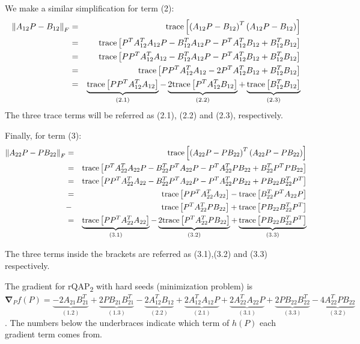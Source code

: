 \documentclass[12pt,oneside,final]{thesis}
\begin{document}
We make a similar simplification for term (2):
\begin{align*}
\left\Vert A_{12}P-B_{12}\right\Vert _{F} & = & \textup{trace}\left[\left(A_{12}P-B_{12}\right)^{T}\left(A_{12}P-B_{12}\right)\right]\\
 & = & \textup{trace}\left[ P^{T}A_{12}^{T}A_{12}P-B_{12}^{T}A_{12}P-P^{T}A_{12}^{T}B_{12}+B_{12}^{T}B_{12}\right]\\
 & = & \textup{trace}\left[ PP^{T}A_{12}^{T}A_{12}-B_{12}^{T}A_{12}P-P^{T}A_{12}^{T}B_{12}+B_{12}^{T}B_{12}\right]\\
 & = & \textup{trace}\left[ PP^{T}A_{12}^{T}A_{12}-2P^{T}A_{12}^{T}B_{12}+B_{12}^{T}B_{12}\right] \\
 & =  & \underbrace{\textup{trace}\left[ PP^{T}A_{12}^{T}A_{12}\right]}_{(2.1)}
 -\underbrace{2 \textup{trace} \left[P^{T}A_{12}^{T}B_{12}\right]}_{(2.2)}
 +\underbrace{\textup{trace} \left[B_{12}^{T}B_{12}\right]}_{(2.3)}
\end{align*}
The three trace terms will be referred as (2.1), (2.2) and
(2.3), respectively.

Finally, for term (3):
\begin{align*}
\left\Vert A_{22}P-PB_{22}\right\Vert _{F} &=&\textup{trace}\left[\left(A_{22}P-PB_{22}\right)^{T}\left(A_{22}P-PB_{22}\right)\right]\\
 &=&\textup{trace}\left[P^{T}A_{22}^{T}A_{22}P-B_{22}^{T}P^{T}A_{22}P-P^{T}A_{22}^{T}PB_{22}+B_{22}^{T}P^{T}PB_{22}\right]\\
 &=&\textup{trace}\left[PP^{T}A_{22}^{T}A_{22}-B_{22}^{T}P^{T}A_{22}P-P^{T}A_{22}^{T}PB_{22}+PB_{22}B_{22}^{T}P^{T}\right]\\
  &=& {\textup{trace}\left[PP^{T}A_{22}^{T}A_{22}\right]}
 - {\textup{trace}\left[ B_{22}^{T}P^{T}A_{22}P\right]}\\
 &-&{\textup{trace}\left[P^{T}A_{22}^{T}PB_{22}\right]}
 +{\textup{trace}\left[ PB_{22}B_{22}^{T}P^{T}\right]}\\
 &=&\underbrace{\textup{trace}\left[PP^{T}A_{22}^{T}A_{22}\right]}_{(3.1)}
 -\underbrace{2\textup{trace}\left[P^{T}A_{22}^{T}PB_{22}\right]}_{(3.2)}
 +\underbrace{\textup{trace}\left[ PB_{22}B_{22}^{T}P^{T}\right]}_{(3.3)}
\end{align*}

The three terms inside the brackets are referred as (3.1),(3.2)  and (3.3)
  respectively.



The gradient for rQAP\textsubscript{2} with hard seeds (minimization problem) is
$\boldsymbol{\nabla}_{P}f(P)=
\underbrace{-2A_{21}B_{21}^{T}}_{(1.2)}
+\underbrace{2PB_{21}B_{21}^{T}}_{(1.3)}
-\underbrace{2A_{12}^{T}B_{12}}_{(2.2)}
+\underbrace{2A_{12}^{T}A_{12}P}_{(2.1)}
+\underbrace{2A_{22}^{T}A_{22}P}_{(3.1)}
+\underbrace{2PB_{22}B_{22}^{T}}_{(3.3)}
-\underbrace{4A_{22}^{T}PB_{22}}_{(3.2)}$. The numbers below the underbraces indicate which term  of $h(P)$ each gradient term comes from.
\end{document}
